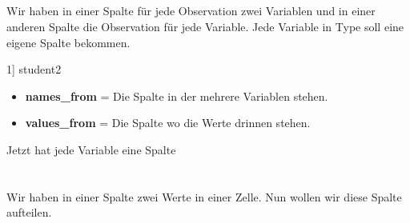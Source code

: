\subsection{}
Wir haben in einer Spalte für jede Observation zwei Variablen und in einer anderen Spalte die Observation für jede Variable.
Jede Variable in Type soll eine eigene Spalte bekommen.
\begin{rcode}{1]}
student2 %
\end{rcode}
\begin{itemize}[noitemsep]
  \item \textbf{names\_from} = Die Spalte in der mehrere Variablen stehen.
  \item \textbf{values\_from} = Die Spalte wo die Werte drinnen stehen.
\end{itemize}
Jetzt hat jede Variable eine Spalte
\section{}
Wir haben in einer Spalte zwei Werte in einer Zelle.
Nun wollen wir diese Spalte aufteilen.

